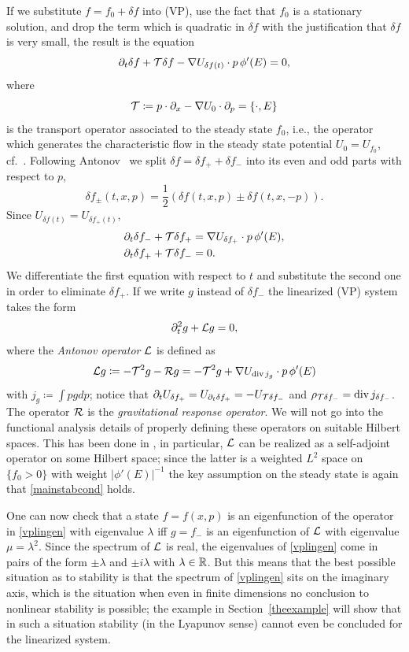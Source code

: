 \documentclass[11pt]{article}
\begin{document}
If we substitute $f = f_0 + \delta f$ into (VP), use the fact that $f_0$
is a stationary solution, and drop the term which is quadratic in $\delta f$
with the justification that $\delta f$ is very small, the result is the equation
\begin{equation}\label{vplingen}
  \partial_t \delta f + {\cal T}  \delta f
  - \nabla U_{\delta f(t)}  \cdot p\, \phi'(E) =0, 
\end{equation}
where
\[
{\cal T} \coloneqq p\cdot\partial_x - \nabla U_0 \cdot\partial_p = \{\cdot,E\}
\]
is the transport operator associated to the steady state $f_0$, i.e., the
operator which generates the characteristic flow in the steady state potential
$U_0=U_{f_0}$, cf.~\cite{RStr}.
Following {\sc Antonov}~\cite{An1961}
we split $\delta f = \delta f_+ + \delta f_-$
into its even and odd parts with respect to $p$,
\[ 
\delta f_\pm (t,x,p) =
\frac{1}{2} \left(\delta f(t,x,p) \pm \delta f(t,x,-p)\right).
\]
Since $U_{\delta f(t)} = U_{\delta f_+(t)}$, 
\begin{align*}
  \partial_t \delta f_- + {\cal T} \delta f_+
  &= \nabla U_{\delta f_+} \cdot p\, \phi'(E), \\
  \partial_t \delta f_+ + {\cal T} \delta f_- &=0.
\end{align*}
We differentiate the first equation with respect to $t$ and
substitute the second one in order to eliminate $\delta f_+$.
If we write $g$ instead of $\delta f_-$ the linearized (VP) system
takes the form
\begin{equation}\label{linvp_2ndo}
  \partial_t^2 g + {\cal L} g = 0,
\end{equation}
where the {\em Antonov operator} ${\cal L}$ is defined as
\[ 
{\cal L} g \coloneqq - {\cal T}^2 g - {{\cal R}} g = - {\cal T}^2 g
+ \nabla U_{\mathrm{div}\, j_{g}}\cdot p\, \phi'(E)
\]
with $j_g \coloneqq \int p g dp$; notice that
$\partial_t U_{\delta f_+} = U_{\partial_t\delta f_+} = - U_{{\cal T} \delta f_-}$ and
$\rho_{{\cal T} \delta f_-}=\mathrm{div}\, j_{\delta f_-}$. The operator ${{\cal R}}$ is the
{\em gravitational response operator}.
We will not go into the functional analysis details of properly defining
these operators on suitable Hilbert spaces. This has been done in
\cite{HaStrRe2022}, in particular, ${\cal L}$ can be realized as a self-adjoint
operator on some Hilbert space; since the latter is a weighted
$L^2$ space on $\{f_0>0\}$ with weight $|\phi'(E)|^{-1}$ the key assumption
on the steady state is again that \eqref{mainstabcond} holds.

One can now check that a state $f=f(x,p)$
is an eigenfunction of the operator in \eqref{vplingen} with eigenvalue
$\lambda$ iff $g=f_-$ is an eigenfunction of ${\cal L}$ with eigenvalue
$\mu = \lambda^2$. Since the spectrum of ${\cal L}$ is real,
the eigenvalues of \eqref{vplingen} come in pairs of the form
$\pm \lambda$ and $\pm i \lambda$ with $\lambda\in \mathbb R$. But this means
that the best possible situation as to stability is
that the spectrum of \eqref{vplingen} sits on the imaginary axis, which
is the situation when even in finite dimensions no conclusion to
nonlinear stability is possible; the example in Section~\ref{theexample}
will show that in such a situation stability (in the Lyapunov sense)
cannot even be concluded for the linearized system.
\end{document}
